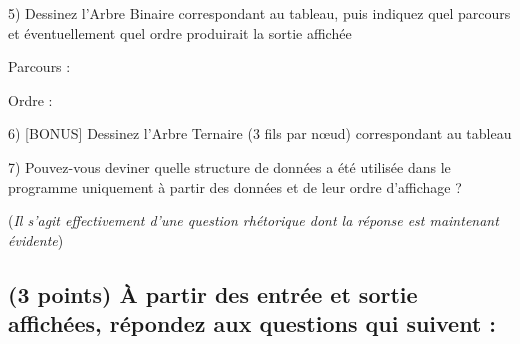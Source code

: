 \documentclass[11pt,a4paper]{article}
\begin{document}
\begin{center}

5) Dessinez l'Arbre Binaire correspondant au tableau, puis indiquez quel parcours et éventuellement quel ordre produirait la sortie affichée

\bigskip

\begin{table}[ht!]
  \centering
  \begin{minipage}{0.65\textwidth}

\phantom{42}

  \end{minipage}
  \hfillx
  \begin{minipage}{0.01\textwidth}


  \end{minipage}
  \hfillx
  \begin{minipage}{0.30\textwidth}
    \raggedright

Parcours :

\bigskip
\bigskip
\bigskip
\bigskip

Ordre :

  \end{minipage}
\end{table}

\bigskip

6) [BONUS] Dessinez l'Arbre Ternaire (3 fils par nœud) correspondant au tableau


\vspace*{8cm}


7) Pouvez-vous deviner quelle structure de données a été utilisée dans le programme uniquement à partir des données et de leur ordre d'affichage ?

(\textit{Il s'agit effectivement d'une question rhétorique dont la réponse est maintenant évidente})

\end{center}


\clearpage

\subsection{(3 points) \`A partir des entrée et sortie affichées, répondez aux questions qui suivent : }
\end{document}
